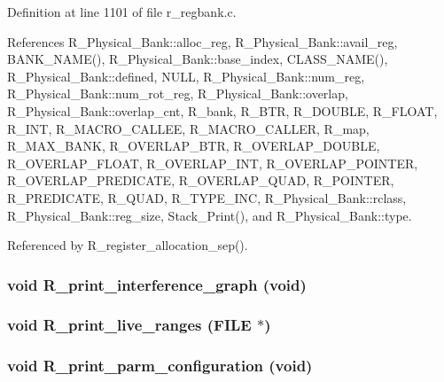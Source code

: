 Definition at line 1101 of file r\_\-regbank.c.

References R\_\-Physical\_\-Bank::alloc\_\-reg, R\_\-Physical\_\-Bank::avail\_\-reg, BANK\_\-NAME(), R\_\-Physical\_\-Bank::base\_\-index, CLASS\_\-NAME(), R\_\-Physical\_\-Bank::defined, NULL, R\_\-Physical\_\-Bank::num\_\-reg, R\_\-Physical\_\-Bank::num\_\-rot\_\-reg, R\_\-Physical\_\-Bank::overlap, R\_\-Physical\_\-Bank::overlap\_\-cnt, R\_\-bank, R\_\-BTR, R\_\-DOUBLE, R\_\-FLOAT, R\_\-INT, R\_\-MACRO\_\-CALLEE, R\_\-MACRO\_\-CALLER, R\_\-map, R\_\-MAX\_\-BANK, R\_\-OVERLAP\_\-BTR, R\_\-OVERLAP\_\-DOUBLE, R\_\-OVERLAP\_\-FLOAT, R\_\-OVERLAP\_\-INT, R\_\-OVERLAP\_\-POINTER, R\_\-OVERLAP\_\-PREDICATE, R\_\-OVERLAP\_\-QUAD, R\_\-POINTER, R\_\-PREDICATE, R\_\-QUAD, R\_\-TYPE\_\-INC, R\_\-Physical\_\-Bank::rclass, R\_\-Physical\_\-Bank::reg\_\-size, Stack\_\-Print(), and R\_\-Physical\_\-Bank::type.

Referenced by R\_\-register\_\-allocation\_\-sep().
\subsubsection{\setlength{\rightskip}{0pt plus 5cm}void R\_\-print\_\-interference\_\-graph (void)}\label{r__regproto_8h_846bba1728f71c371f564d6b8996b51e}


\subsubsection{\setlength{\rightskip}{0pt plus 5cm}void R\_\-print\_\-live\_\-ranges (FILE $\ast$)}\label{r__regproto_8h_f9ae5f7713e9d052f9d2c31c98d58e55}


\subsubsection{\setlength{\rightskip}{0pt plus 5cm}void R\_\-print\_\-parm\_\-configuration (void)}\label{r__regproto_8h_b1f91d964377d95cc9045270fb9b3e8e}




